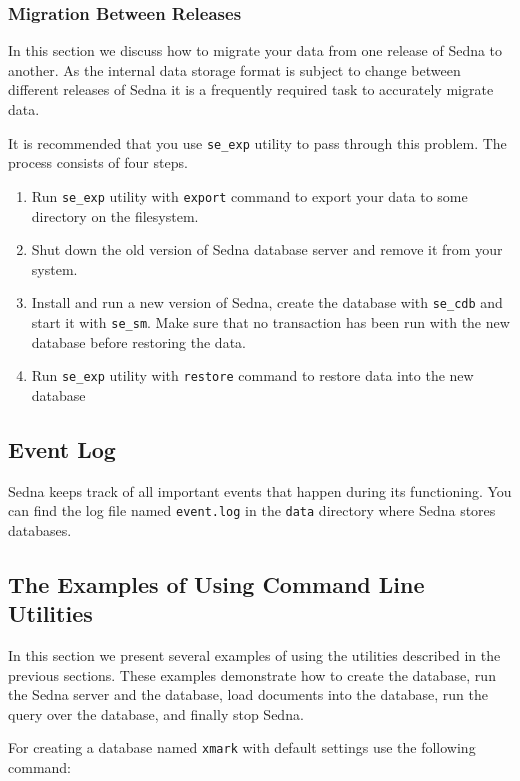 \documentclass[a4paper,12pt]{article}
\begin{document}
\subsubsection{Migration Between Releases}

In this section we discuss how to migrate your data from one release of Sedna to another. 
As the internal data storage format is subject to change between different releases of Sedna it is a 
frequently required task to accurately migrate data.  

It is recommended that you use \verb!se_exp! utility to pass through this problem. The process 
consists of four steps.

\begin{enumerate}
\item
Run \verb!se_exp! utility with \verb!export! command to export your data to some 
directory on the filesystem.
\item
Shut down the old version of Sedna database server and remove it from your system. 
\item
Install and run a new version of Sedna, create the database with \verb!se_cdb! and start it with 
\verb!se_sm!. Make sure that no transaction has been run with the new database before restoring 
the data.
\item
Run \verb!se_exp! utility with \verb!restore! command to restore data into the new database
\end{enumerate}

\subsection{Event Log}
Sedna keeps track of all important events that happen during its functioning. You can find the log file named \verb!event.log! in the \verb!data! directory where Sedna stores databases. 

\subsection{The Examples of Using Command Line Utilities}

In this section we present several examples of using the utilities described in the previous sections. These examples demonstrate how to create the database, run the Sedna server and the database, load documents into the database, run the query over the database, and finally stop Sedna.

For creating a database named \verb!xmark! with default settings use the following command:
\end{document}
